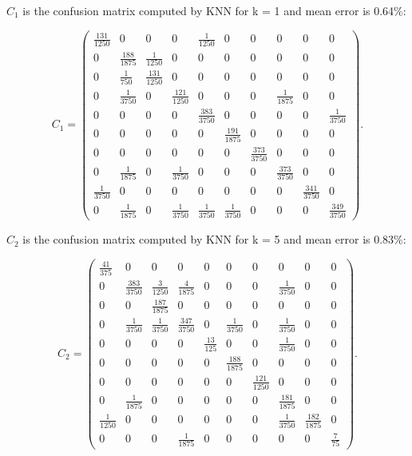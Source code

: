 \documentclass[11pt]{article}
\begin{document}
$C_1$ is the confusion matrix computed by KNN for k = 1 and mean error is 0.64\%:

$$C_1 = \left(\begin{array}{cccccccccc} \frac{131}{1250} & 0 & 0 & 0 & \frac{1}{1250} & 0 & 0 & 0 & 0 & 0\\ 0 & \frac{188}{1875} & \frac{1}{1250} & 0 & 0 & 0 & 0 & 0 & 0 & 0\\ 0 & \frac{1}{750} & \frac{131}{1250} & 0 & 0 & 0 & 0 & 0 & 0 & 0\\ 0 & \frac{1}{3750} & 0 & \frac{121}{1250} & 0 & 0 & 0 & \frac{1}{1875} & 0 & 0\\ 0 & 0 & 0 & 0 & \frac{383}{3750} & 0 & 0 & 0 & 0 & \frac{1}{3750}\\ 0 & 0 & 0 & 0 & 0 & \frac{191}{1875} & 0 & 0 & 0 & 0\\ 0 & 0 & 0 & 0 & 0 & 0 & \frac{373}{3750} & 0 & 0 & 0\\ 0 & \frac{1}{1875} & 0 & \frac{1}{3750} & 0 & 0 & 0 & \frac{373}{3750} & 0 & 0\\ \frac{1}{3750} & 0 & 0 & 0 & 0 & 0 & 0 & 0 & \frac{341}{3750} & 0\\ 0 & \frac{1}{1875} & 0 & \frac{1}{3750} & \frac{1}{3750} & \frac{1}{3750} & 0 & 0 & 0 & \frac{349}{3750} \end{array}\right).$$

$C_2$ is the confusion matrix computed by KNN for k = 5 and mean error is 0.83\%:

 $$C_2 = \left(\begin{array}{cccccccccc} \frac{41}{375} & 0 & 0 & 0 & 0 & 0 & 0 & 0 & 0 & 0\\ 0 & \frac{383}{3750} & \frac{3}{1250} & \frac{4}{1875} & 0 & 0 & 0 & \frac{1}{3750} & 0 & 0\\ 0 & 0 & \frac{187}{1875} & 0 & 0 & 0 & 0 & 0 & 0 & 0\\ 0 & \frac{1}{3750} & \frac{1}{3750} & \frac{347}{3750} & 0 & \frac{1}{3750} & 0 & \frac{1}{3750} & 0 & 0\\ 0 & 0 & 0 & 0 & \frac{13}{125} & 0 & 0 & \frac{1}{3750} & 0 & 0\\ 0 & 0 & 0 & 0 & 0 & \frac{188}{1875} & 0 & 0 & 0 & 0\\ 0 & 0 & 0 & 0 & 0 & 0 & \frac{121}{1250} & 0 & 0 & 0\\ 0 & \frac{1}{1875} & 0 & 0 & 0 & 0 & 0 & \frac{181}{1875} & 0 & 0\\ \frac{1}{1250} & 0 & 0 & 0 & 0 & 0 & 0 & \frac{1}{3750} & \frac{182}{1875} & 0\\ 0 & 0 & 0 & \frac{1}{1875} & 0 & 0 & 0 & 0 & 0 & \frac{7}{75} \end{array}\right).
$$
\end{document}
